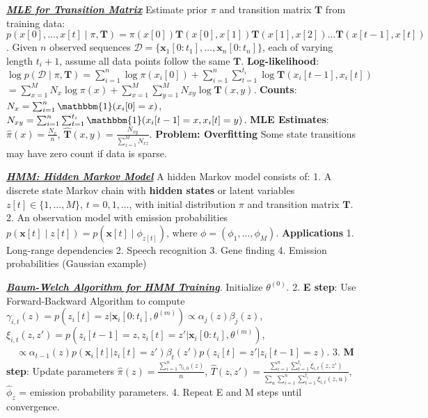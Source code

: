 \documentclass[10pt]{article}
\newcommand{\bulletPoint}[1]{\ul{\textit{\textbf{#1}}}}
\begin{document}
\begin{multicols*}{2}
\bulletPoint{MLE for Transition Matrix}\quad
Estimate prior $\pi$ and transition matrix $\mathbf{T}$ from training data:
$p(x[0], \dots, x[t] \mid \pi, \mathbf{T}) = \pi(x[0]) \mathbf{T}(x[0], x[1]) \mathbf{T}(x[1], x[2]) \dots \mathbf{T}(x[t-1], x[t])$.
Given $n$ observed sequences $\mathcal{D} = \{\mathbf{x}_1[0:t_1], \dots, \mathbf{x}_n[0:t_n]\}$, each of varying length $t_i+1$, assume all data points follow the same $\mathbf{T}$. 
\textbf{Log-likelihood}: $\log p(\mathcal{D} \mid \pi, \mathbf{T}) = \sum_{i=1}^{n} \log \pi(x_i[0]) + \sum_{i=1}^{n} \sum_{t=1}^{t_i} \log \mathbf{T}(x_i[t-1], x_i[t])$
$= \sum_{x=1}^{M} N_x \log \pi(x) + \sum_{x=1}^{M} \sum_{y=1}^{M} N_{xy} \log \mathbf{T}(x, y)$. 
\textbf{Counts}: $N_x = \sum_{i=1}^{n} \mathbbm{1}(x_i[0] = x)$, $N_{xy} = \sum_{i=1}^{n} \sum_{t=1}^{t_i} \mathbbm{1}(x_i[t-1] = x, x_i[t] = y)$. 
\textbf{MLE Estimates}: $\hat{\pi}(x) = \frac{N_x}{n}$, $\hat{\mathbf{T}}(x, y) = \frac{N_{xy}}{\sum_{z=1}^{M} N_{xz}}$. 
\textbf{Problem: Overfitting}  
Some state transitions may have zero count if data is sparse.

\bulletPoint{HMM: Hidden Markov Model}\quad
A hidden Markov model consists of:
1. A discrete state Markov chain with \textbf{hidden states} or latent variables $z[t] \in \{1, \dots, M\}$, $t = 0,1,\dots$, with initial distribution $\pi$ and transition matrix $\mathbf{T}$.
2. An observation model with emission probabilities $p(\mathbf{x}[t] \mid z[t]) = p(\mathbf{x}[t] \mid \phi_{z[t]})$, where $\phi = (\phi_1, \dots, \phi_M)$. 
\textbf{Applications}
1. Long-range dependencies
2. Speech recognition
3. Gene finding
4. Emission probabilities (Gaussian example)

\bulletPoint{Baum-Welch Algorithm for HMM Training}. Initialize $\theta^{(0)}$.
2. \textbf{E step}: Use Forward-Backward Algorithm to compute
    $\gamma_{i,t}(z) = p(z_i[t] = z | \mathbf{x}_i[0:t_i], \theta^{(m)}) \propto \alpha_j(z) \beta_j(z)$, 
    $\xi_{i,t}(z,z') = p(z_i[t-1] = z, z_i[t] = z' | \mathbf{x}_i[0:t_i], \theta^{(m)})$, 
    $\quad \propto \alpha_{t-1}(z) p(\mathbf{x}_i[t] | z_i[t]=z') \beta_t(z') p(z_i[t] = z' | z_i[t-1] = z)$. 
3. \textbf{M step}: Update parameters
    $\hat{\pi}(z) = \frac{\sum_{i=1}^{n} \gamma_{i,0}(z)}{n}$, 
    $\hat{T}(z,z') = \frac{\sum_{i=1}^{n} \sum_{t=1}^{t_i} \xi_{i,t}(z,z')}{\sum_u \sum_{i=1}^{n} \sum_{t=1}^{t_i} \xi_{i,t}(z,u)}$, 
    $\hat{\phi}_z$ = emission probability parameters.
4. Repeat E and M steps until convergence.
  

\end{multicols*}
\end{document}
